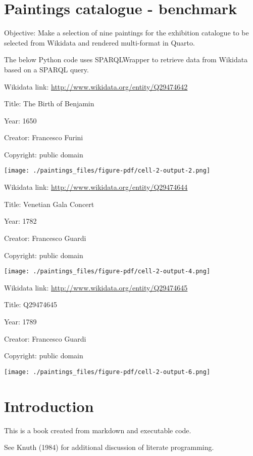 \documentclass[
  letterpaper,
  DIV=11,
  numbers=noendperiod]{scrreprt}
\begin{document}

\hypertarget{paintings-catalogue---benchmark}{%
\chapter{Paintings catalogue -
benchmark}\label{paintings-catalogue---benchmark}}

Objective: Make a selection of nine paintings for the exhibition
catalogue to be selected from Wikidata and rendered multi-format in
Quarto.

The below Python code uses SPARQLWrapper to retrieve data from Wikidata
based on a SPARQL query.

Wikidata link: \url{http://www.wikidata.org/entity/Q29474642}

Title: The Birth of Benjamin

Year: 1650

Creator: Francesco Furini

Copyright: public domain

\texttt{[image: ./paintings\_files/figure-pdf/cell-2-output-2.png]}

Wikidata link: \url{http://www.wikidata.org/entity/Q29474644}

Title: Venetian Gala Concert

Year: 1782

Creator: Francesco Guardi

Copyright: public domain

\texttt{[image: ./paintings\_files/figure-pdf/cell-2-output-4.png]}

Wikidata link: \url{http://www.wikidata.org/entity/Q29474645}

Title: Q29474645

Year: 1789

Creator: Francesco Guardi

Copyright: public domain

\texttt{[image: ./paintings\_files/figure-pdf/cell-2-output-6.png]}


\hypertarget{introduction}{%
\chapter{Introduction}\label{introduction}}

This is a book created from markdown and executable code.

See Knuth (1984) for additional discussion of literate programming.
\end{document}
